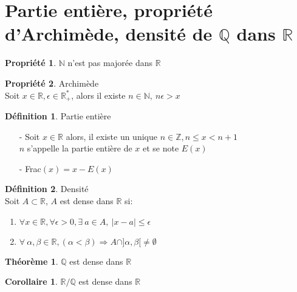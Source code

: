 \documentclass[fleqn]{article}
\theoremstyle{definition} \newtheorem*{defi}{D\'efinition}
\theoremstyle{definition} \newtheorem*{theo}{Th\'eor\`eme}
\theoremstyle{definition} \newtheorem*{coro}{Corollaire}
\theoremstyle{remark} \newtheorem*{rqs}{Remarques}
\theoremstyle{definition} \newtheorem*{prop}{Propri\'et\'e}
\begin{document}
\section{Partie entière, propri\'et\'e d'Archim\`ede, densit\'e de $\mathbb{Q}$ dans $\mathbb{R}$}
\begin{prop}
	$\mathbb{N}$ n'est pas major\'ee dans $\mathbb{R}$
\end{prop}
\begin{prop} Archim\`ede \\
	Soit $x \in \mathbb{R}, \epsilon \in \mathbb{R}_+^*$, alors il existe $n \in \mathbb{N},\ n\epsilon>x$
\end{prop}
\begin{defi} Partie enti\`ere
	\begin{itemize}
		\item [-] Soit $x \in \mathbb{R}$ alors, il existe un unique $n \in \mathbb{Z}, n \leq x < n+1$ \\
			$n$ s'appelle la partie enti\`ere de $x$ et se note $E(x)$
		\item [-] Frac$(x) = x - E(x)$
	\end{itemize}
\end{defi}
\begin{defi} Densit\'e \\
	Soit $A \subset \mathbb{R}$, $A$ est dense dans $\mathbb{R}$ si:
	\begin{enumerate}
		\item $\forall x \in \mathbb{R}, \forall \epsilon > 0, \exists\ a \in A,\ |x-a| \leq \epsilon$
		\item $\forall\ \alpha,\beta \in \mathbb{R}, (\alpha < \beta) \Rightarrow A \cap ]\alpha, \beta[ \neq \emptyset$
	\end{enumerate}
	\begin{theo} $\mathbb{Q}$ est dense dans $\mathbb{R}$ \end{theo}
	\begin{coro} $\mathbb{R}/\mathbb{Q}$ est dense dans $\mathbb{R}$ \end{coro}
\end{defi}
\end{document}
